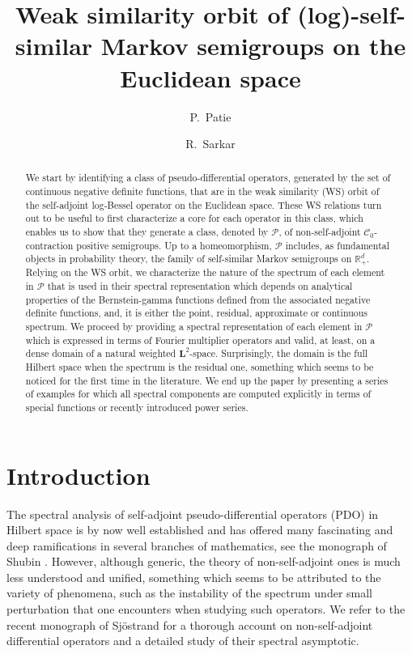 \documentclass[12pt]{amsart}
\title[WS orbit of (log)-self-similar Markov semigroups]{Weak similarity orbit of (log)-self-similar Markov semigroups on the Euclidean space}
\author{P.~Patie}\thanks{The authors are grateful to two anonymous referees for useful comments and a careful reading that lead to an improvement of the quality of the paper.}
\author{R.~Sarkar}
\date{}
\newcommand{\hptg}[2]{\hypertarget{#1}{#2}}
\numberwithin{equation}{section}
\newcommand{\bb}{\mathbb}
\newcommand{\cc}{\mathcal}
\newcommand{\ccP}{\mathscr{P}}
\newcommand{\bmrm}[2][2]{\mathbf{#2}^{#1}}
\theoremstyle{definition}
\theoremstyle{assump}
\theoremstyle{remark}
\begin{document}
\maketitle
\begin{abstract}
We start by identifying a class  of pseudo-differential operators, generated by  the set of continuous negative definite functions,  that are in the weak similarity (WS) orbit of the self-adjoint log-Bessel operator on the Euclidean space. These WS relations turn out to be  useful to first characterize a core for each operator in this class, which enables us to show that they generate  a class, denoted by $\ccP$, of non-self-adjoint $\cc{C}_0$-contraction positive semigroups. Up to a homeomorphism, $\ccP$  includes, as fundamental objects in probability theory, the family of self-similar Markov semigroups on $\bb{R}_+^d$. Relying on the WS orbit, \hptg{C4}{we  characterize the nature of the spectrum of each element in $\ccP$ that is used in their spectral representation} which depends on analytical properties of the Bernstein-gamma functions defined from the associated  negative definite functions, and, it is  either the point, residual, approximate or continuous spectrum. We proceed by providing a spectral representation of each element in $\ccP$ which is expressed in terms of Fourier multiplier operators and valid, at least, on a dense domain of a natural weighted $\bmrm{L}$-space.   Surprisingly, the domain is the full Hilbert space when the spectrum is the residual one, something which seems to be noticed for the first time in the literature. We end up the paper by presenting a series of examples for which all spectral components are computed explicitly in terms of special functions or recently introduced power series.




\end{abstract}



\section{Introduction}
The spectral analysis of self-adjoint pseudo-differential operators (PDO) in Hilbert space  is by now well established and has offered many fascinating and deep ramifications in several branches of mathematics, see the monograph of Shubin \cite{Shubin}.
However,  although generic, the theory of non-self-adjoint ones is much less understood and unified, something which seems to be attributed to the variety of phenomena, such as the  instability of the spectrum under small perturbation that one encounters when studying such operators. We refer to the recent monograph of  Sj\"ostrand \cite{Sjos} for a thorough account on non-self-adjoint differential operators and a detailed study of their  spectral asymptotic.
\end{document}
